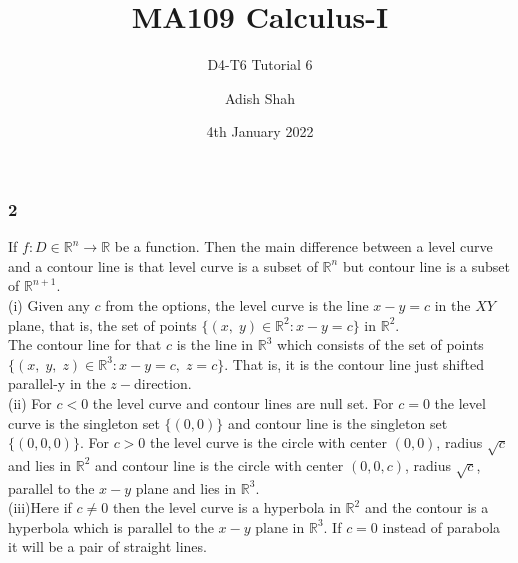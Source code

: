 \documentclass[handout]{beamer}
\title[MA109 Calculus-I] %
{MA109 Calculus-I}
\subtitle{D4-T6 Tutorial 6}
\author[Adish Shah] %
{Adish Shah}
\date[4th January 2022] %
{4th January 2022}
\begin{document}
\frame{\titlepage}




\begin{frame}
    \frametitle{2}
    If $f:D\in\mathbb{R}^n\to\mathbb{R}$ be a function. Then the main difference between a level curve and a contour line is that level curve is a subset of $\mathbb{R}^n$ but contour line is a subset of $\mathbb{R}^{n+1}$.\\
  (i) Given any $c$ from the options, the level curve is the line $x - y = c$ in the $XY$ plane, that is, the set of points $\{(x,\;y) \in \mathbb{R}^2 : x - y = c\}$ in $\mathbb{R}^2.$\\
	The contour line for that $c$ is the line in $\mathbb{R}^3$ which consists of the set of points $\{(x,\;y,\;z)\in\mathbb{R}^3 : x - y = c,\;z = c\}.$ That is, it is the contour line just shifted parallel-y in the $z-$direction.\\
	(ii) For $c<0$ the level curve and contour lines are null set. For $c=0$ the level curve is the singleton set $\{(0,0)\}$ and contour line is the singleton set $\{(0,0,0)\}$. For $c>0$ the level curve is the circle with center $(0,0)$, radius $\sqrt{c}$ and lies in $\mathbb{R}^2$ and contour line is the circle with center $(0,0,c)$, radius $\sqrt{c}$, parallel to the $x-y$ plane and lies in $\mathbb{R}^3$.\\
	(iii)Here if $c\neq 0$ then the level curve is a hyperbola in $\mathbb{R}^2$ and the contour is a hyperbola which is parallel to the $x-y$ plane in $\mathbb{R}^3$. If $c=0$ instead of parabola it will be a pair of straight lines.
\end{frame}
\end{document}
